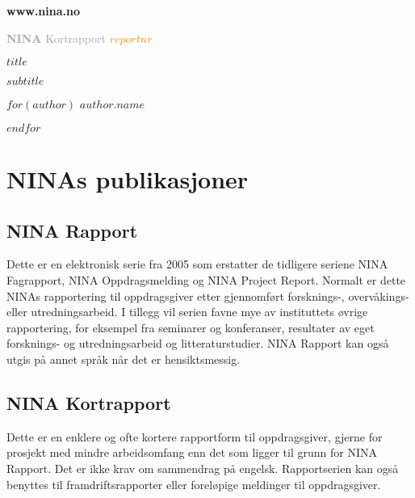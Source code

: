 \documentclass[11pt, a4paper]{article}
\newcommand{\shadOrange}[1]{\textcolor{lightOrange}{#1}}
\newcommand{\orange}[1]{\textcolor{darkOrange}{#1}}
\newcommand{\darkGrey}[1]{\textcolor{darkgrey}{#1}}
\begin{document}
\begin{titlepage}

\thispagestyle{titlefooter}
\begin{center}
\vspace{-1cm}
\Large\shadOrange{\textbf{www.nina.no}}
\end{center}
\vspace{2cm}

\Huge{\darkGrey{\textbf{NINA} Kortrapport}} \hspace{.7cm} \textbf{\orange{$reportnr$}}
\vspace{2cm}

\Huge{$title$} \par\vspace{.5cm}
\huge{$subtitle$} \par\vspace{1cm}

$for(author)$
\LARGE{$author.name$} \par
$endfor$

\restoregeometry
\end{titlepage}
\cfoot{}

\section*{NINAs publikasjoner}


\subsection*{NINA Rapport}
Dette er en elektronisk serie fra 2005 som erstatter de tidligere seriene NINA Fagrapport, NINA Oppdragsmelding og NINA Project Report. Normalt er dette NINAs rapportering til oppdragsgiver etter gjennomført forsknings\hyp{}, overvåkings\hyp{} eller utredningsarbeid. I tillegg vil serien favne mye av instituttets øvrige rapportering, for eksempel fra seminarer og konferanser, resultater av eget forsknings\hyp{} og utredningsarbeid og litteraturstudier. NINA Rapport kan også utgis på annet språk når det er hensiktsmessig.

\subsection*{NINA Kortrapport}
Dette er en enklere og ofte kortere rapportform til oppdragsgiver, gjerne for prosjekt med mindre arbeidsomfang enn det som ligger til grunn for NINA Rapport. Det er ikke krav om sammendrag på engelsk. Rapportserien kan også benyttes til framdriftsrapporter eller foreløpige meldinger til oppdragsgiver.
\end{document}
